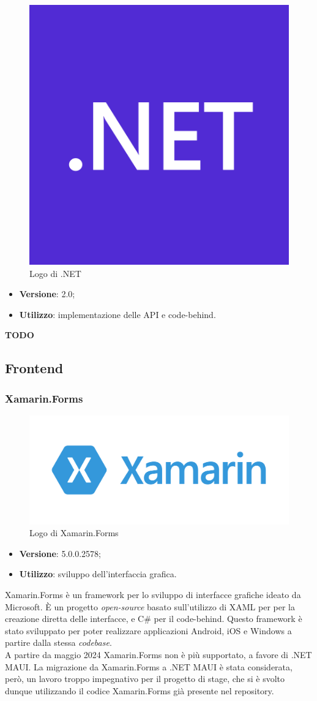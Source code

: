 \begin{figure}[H]
    \centering 
    \includegraphics[width=0.2\columnwidth]{images/loghi/Microsoft_.NET_logo.png} 
    \caption{Logo di .NET}
\end{figure}

\begin{itemize}
    \item \textbf{Versione}: 2.0;
    \item \textbf{Utilizzo}: implementazione delle \gls{API} e \gls{code-behind}.
\end{itemize}

\textbf{TODO}

\subsection{Frontend}

\subsubsection{Xamarin.Forms}

\begin{figure}[H]
    \centering 
    \includegraphics[width=0.4\columnwidth]{images/loghi/xamarin-logo.png} 
    \caption{Logo di Xamarin.Forms}
\end{figure}

\begin{itemize}
    \item \textbf{Versione}: 5.0.0.2578;
    \item \textbf{Utilizzo}: sviluppo dell'interfaccia grafica.
\end{itemize}
Xamarin.Forms è un framework per lo sviluppo di interfacce grafiche ideato da Microsoft. È un progetto \emph{open-source} basato sull'utilizzo di XAML per per la creazione diretta delle interfacce, e C\# per il \gls{code-behind}. Questo framework è stato sviluppato per poter realizzare applicazioni Android, iOS e Windows a partire dalla stessa \emph{codebase}.\\
A partire da maggio 2024 Xamarin.Forms non è più supportato, a favore di .NET MAUI. La migrazione da Xamarin.Forms a .NET MAUI è stata considerata, però, un lavoro troppo impegnativo per il progetto di stage, che si è svolto dunque utilizzando il codice Xamarin.Forms già presente nel repository.


